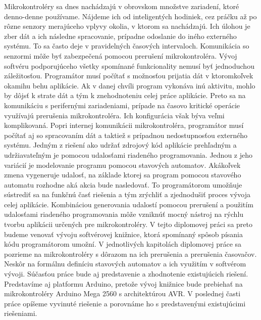
Mikrokontroléry sa dnes nachádzajú v obrovskom množstve zariadení, ktoré denno-denne používame. Nájdeme ich od inteligentých hodiniek, cez práčku až po rôzne senzory merajúceho vplyvy okolia,
v ktorom sa nachádzajú. Ich úlohou je zber dát a ich následne spracovanie, prípadne odoslanie do iného externého systému. To sa často deje v pravidelných časových intervaloch. Komunikácia
so senzormi môže byť zabezpečená pomocou prerušení mikrokontroléra. Vývoj softvéru podporujúceho všetky spomínané funkcionality nemusí byť jednoduchou záležitosťou. Programátor musí počítať
s možnosťou prijatia dát v ktoromkoľvek okamihu behu aplikácie. Ak v danej chvíli program vykonáva inú aktivitu, mohlo by dôjsť k strate dát a tým k znehodnoteniu celej práce aplikácie. Preto
sa na komunikáciu s perifernými zariadeniami, prípade na časovo kritické operácie využívajú prerušenia mikrokontroléra. Ich konfigurácia však býva veľmi komplikovaná.  Popri internej
komunikácii mikrokontroléra, programátor musí počítať aj so spracovaním dát a taktiež s prípadnou nedostupnosťou externého systému. Jedným z riešení ako udržať zdrojový kód aplikácie
prehľadným a udržiavateľným je pomocou udalosťami riadeného programovania. Jednou z jeho variácií je modelovanie programu pomocou stavových automatov. Akákoľvek zmena vygeneruje udalosť,
na základe ktorej sa program pomocou stavového automatu rozhodne aká akcia bude nasledovať. To programátorom umožňuje sústrediť sa na funkčnú časť riešenia a tým zrýchliť a zjednodušiť proces
vývoja celej aplikácie. Kombináciou generovania udalostí pomocou prerušení a použitím udalosťami riadeného programovania môže vzniknúť mocný nástroj na rýchlu tvorbu aplikácii určených
pre mikrokontroléry. V tejto diplomovej práci sa preto budeme venovať vývoju softvérovej knižnice, ktorá spomínaný spôsob písania kódu programátorom umožní. V jednotlivých kapitolách
diplomovej práce sa pozrieme na mikrokontroléry s dôrazom na ich prerušenia a prerušenia časovačov. Neskôr na formálnu definíciu stavových automatov a ich využitím v softvérom vývoji. Súčasťou
práce bude aj predstavenie a zhodnotenie existujúcich riešení. Predstavíme aj platformu Arduino, pretože vývoj knižnice bude prebiehať na mikrokontroléry Arduino Mega 2560 s architektúrou AVR.
V poslednej časti práce opíšeme vyvinuté riešenie a porovnáme ho s predstavenými existujúcimi riešeniami.